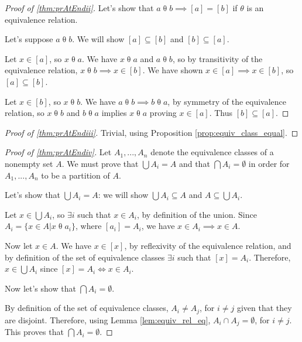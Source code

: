 
\label{proofsection:prAtEndii}\begin{proof}[Proof of \autoref{thm:prAtEndii}]\label{proof:prAtEndii}Let's show that $a \mathrel {\theta } b \implies [a] = [b]$ if $\theta $ is an equivalence relation. \par Let's suppose $a \mathrel {\theta } b$. We will show $[a] \subseteq [b]$ and $[b] \subseteq [a]$. \par Let $x \in [a]$, so $x \mathrel {\theta } a$. We have $x \mathrel {\theta } a$ and $a \mathrel {\theta } b$, so by transitivity of the equivalence relation, $x \mathrel {\theta } b \implies x \in [b]$. We have shown $x \in [a] \implies x \in [b]$, so $[a] \subseteq [b]$. \par Let $x \in [b]$, so $x \mathrel {\theta } b$. We have $a \mathrel {\theta } b \implies b \mathrel {\theta } a$, by symmetry of the equivalence relation, so $x \mathrel {\theta } b$ and $b \mathrel {\theta } a$ implies $x \mathrel {\theta } a$ proving $x \in [a]$. Thus $[b] \subseteq [a]$.\end{proof}
\label{proofsection:prAtEndiii}\begin{proof}[Proof of \autoref{thm:prAtEndiii}]\label{proof:prAtEndiii}Trivial, using Proposition \ref {prop:equiv_class_equal}.\end{proof}
\label{proofsection:prAtEndiv}\begin{proof}[Proof of \autoref{thm:prAtEndiv}]\label{proof:prAtEndiv}Let $A_1, ...,A_n$ denote the equivalence classes of a nonempty set $A$. We must prove that $\bigcup A_i = A$ and that $\bigcap A_i = \emptyset $ in order for $A_1, ...,A_n$ to be a partition of $A$. \par Let's show that $\bigcup A_i = A$: we will show $\bigcup A_i \subseteq A$ and $A \subseteq \bigcup A_i$. \par Let $x \in \bigcup A_i$, so $\exists i$ such that $x \in A_i$, by definition of the union. Since $A_i = \{x \in A | x \mathrel {\theta } a_i\}$, where $[a_i] = A_i$, we have $x \in A_i \implies x \in A$. \par Now let $x \in A$. We have $x \in [x]$, by reflexivity of the equivalence relation, and by definition of the set of equivalence classes $\exists i$ such that $[x] = A_i$. Therefore, $x \in \bigcup A_i$ since $[x] = A_i \iff x \in A_i$. \par Now let's show that $\bigcap A_i = \emptyset $. \par By definition of the set of equivalence classes, $A_i \neq A_j$, for $i \neq j$ given that they are disjoint. Therefore, using Lemma \ref {lem:equiv_rel_eq}, $A_i \cap A_j = \emptyset $, for $i \neq j$. This proves that $\bigcap A_i = \emptyset $.\end{proof}
